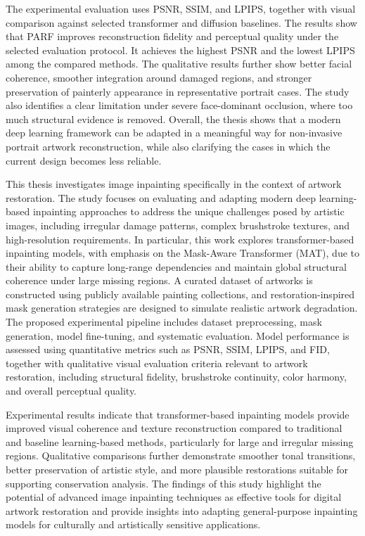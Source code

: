 \documentclass[12pt, twoside]{report}
\begin{document}
The experimental evaluation uses PSNR, SSIM, and LPIPS, together with visual comparison against selected transformer and diffusion baselines. The results show that PARF improves reconstruction fidelity and perceptual quality under the selected evaluation protocol. It achieves the highest PSNR and the lowest LPIPS among the compared methods. The qualitative results further show better facial coherence, smoother integration around damaged regions, and stronger preservation of painterly appearance in representative portrait cases. The study also identifies a clear limitation under severe face-dominant occlusion, where too much structural evidence is removed. Overall, the thesis shows that a modern deep learning framework can be adapted in a meaningful way for non-invasive portrait artwork reconstruction, while also clarifying the cases in which the current design becomes less reliable.

\iffalse

This thesis investigates image inpainting specifically in the context of artwork restoration. The study focuses on evaluating and adapting modern deep learning-based inpainting approaches to address the unique challenges posed by artistic images, including irregular damage patterns, complex brushstroke textures, and high-resolution requirements. In particular, this work explores transformer-based inpainting models, with emphasis on the Mask-Aware Transformer (MAT), due to their ability to capture long-range dependencies and maintain global structural coherence under large missing regions.
A curated dataset of artworks is constructed using publicly available painting collections, and restoration-inspired mask generation strategies are designed to simulate realistic artwork degradation. The proposed experimental pipeline includes dataset preprocessing, mask generation, model fine-tuning, and systematic evaluation. Model performance is assessed using quantitative metrics such as PSNR, SSIM, LPIPS, and FID, together with qualitative visual evaluation criteria relevant to artwork restoration, including structural fidelity, brushstroke continuity, color harmony, and overall perceptual quality.

Experimental results indicate that transformer-based inpainting models provide improved visual coherence and texture reconstruction compared to traditional and baseline learning-based methods, particularly for large and irregular missing regions. Qualitative comparisons further demonstrate smoother tonal transitions, better preservation of artistic style, and more plausible restorations suitable for supporting conservation analysis. The findings of this study highlight the potential of advanced image inpainting techniques as effective tools for digital artwork restoration and provide insights into adapting general-purpose inpainting models for culturally and artistically sensitive applications.
\end{document}
